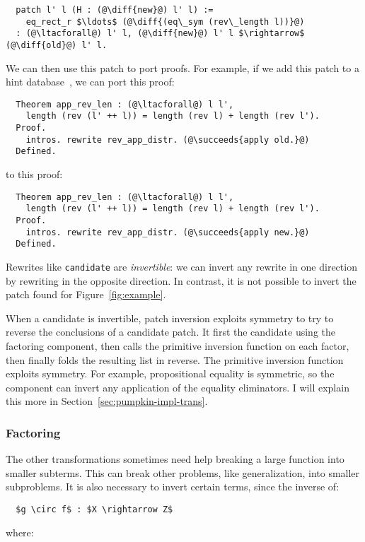 \begin{lstlisting}
  patch l' l (H : (@\diff{new}@) l' l) :=
    eq_rect_r $\ldots$ (@\diff{(eq\_sym (rev\_length l))}@)
  : (@\ltacforall@) l' l, (@\diff{new}@) l' l $\rightarrow$ (@\diff{old}@) l' l.
\end{lstlisting}
We can then use this patch to port proofs.
For example, if we add this patch to a hint database~\cite{hints},
we can port this proof:

\begin{lstlisting}
  Theorem app_rev_len : (@\ltacforall@) l l',
    length (rev (l' ++ l)) = length (rev l) + length (rev l').
  Proof.
    intros. rewrite rev_app_distr. (@\succeeds{apply old.}@)
  Defined.
\end{lstlisting}
to this proof:

\begin{lstlisting}
  Theorem app_rev_len : (@\ltacforall@) l l',
    length (rev (l' ++ l)) = length (rev l) + length (rev l').
  Proof.
    intros. rewrite rev_app_distr. (@\succeeds{apply new.}@)
  Defined.
\end{lstlisting}

Rewrites like \lstinline{candidate} are \textit{invertible}:
we can invert any rewrite in one direction by rewriting in the opposite direction.
In contrast, it is not possible to invert the patch \sysname
found for Figure~\ref{fig:example}.

When a candidate is invertible, patch inversion exploits symmetry to try to reverse the conclusions of a candidate patch.
It first  the candidate using the factoring component, then calls the primitive inversion
function on each factor, then finally folds the resulting list in reverse.
The primitive inversion function exploits symmetry. 
For example, propositional equality is symmetric, so the component can invert any application of the equality eliminators.
I will explain this more in Section~\ref{sec:pumpkin-impl-trans}.

\subsubsection*{Factoring} The other transformations sometimes need help breaking a large function into smaller subterms.
This can break other problems, like generalization, into smaller subproblems.
It is also necessary to invert certain terms, since the inverse of:

\begin{lstlisting}
  $g \circ f$ : $X \rightarrow Z$
\end{lstlisting}
where:

